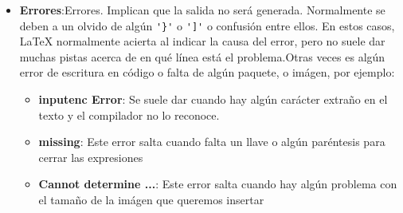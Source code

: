 \begin{itemize}
\begin{itemize}
\begin{figure}[h]
	\end{figure}
	\end{itemize}


\item \textbf{Errores}:Errores. Implican que la salida no será generada. Normalmente se deben a un olvido de algún \verb|'}'| o \verb|']'| o confusión entre ellos. En estos casos, LaTeX normalmente acierta al indicar la causa del error, pero no suele dar muchas pistas acerca de en qué línea está el problema.Otras veces es algún error de escritura en código o falta de algún paquete, o imágen, por ejemplo:

	\begin{itemize}
	\item  \textbf{inputenc Error}:
	Se suele dar cuando hay algún carácter extraño en el texto y el compilador no lo reconoce.
	\begin{figure}[h]
 	\begin{fblock}
  	\color{red}{
  	\begin{verbatim}
	./Capitulos/capitulo3.tex:1122:Package inputenc Error: 
	Keyboard character used is undefined(inputenc)
	in inputencoding `utf8'. ...x¿ 
  	\end{verbatim}
	}
 	\end{fblock}
	
	\end{figure}
	\end{itemize}

	\begin{itemize}
	\item  \textbf{missing}:
	Este error salta cuando falta un llave  o algún paréntesis para cerrar las expresiones
	\begin{figure}[h]
 	\begin{fblock}
  	\color{red}{
  	\begin{verbatim}
	
	./Capitulos/capitulo3.tex:1122:Missing } inserted. ...ux| 

  	\end{verbatim}
	}
 	\end{fblock}
	
	\end{figure}
	\end{itemize}


	\begin{itemize}
	\item  \textbf{Cannot determine ...}:
	Este error salta cuando hay algún problema con el tamaño de la imágen que queremos insertar
	\begin{figure}[h]
 	\begin{fblock}
  	\color{red}{
  	\begin{verbatim}
	

\end{verbatim}}
\end{fblock}
\end{figure}
\end{itemize}
\end{itemize}
